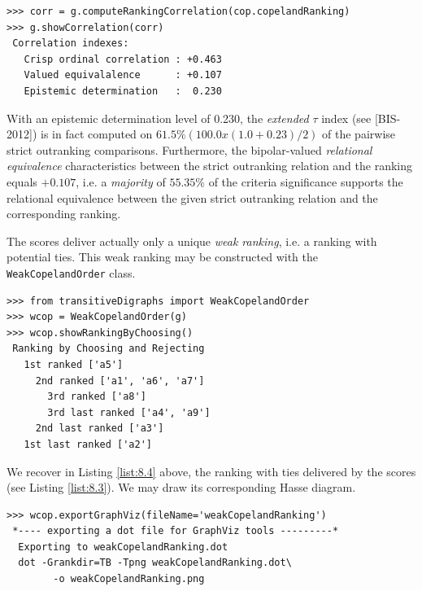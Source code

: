 \begin{lstlisting}[caption={Checking the quality of the \Copeland Ranking},label=list:8.4]
>>> corr = g.computeRankingCorrelation(cop.copelandRanking)
>>> g.showCorrelation(corr)
 Correlation indexes:
   Crisp ordinal correlation : +0.463
   Valued equivalalence      : +0.107
   Epistemic determination   :  0.230
\end{lstlisting}

With an epistemic determination level of 0.230, the \emph{extended} \Kendall $\tau$ index (see [BIS-2012]) is in fact computed on $61.5\% (100.0 x (1.0 + 0.23)/2)$ of the pairwise strict outranking comparisons. Furthermore, the bipolar-valued \emph{relational equivalence} characteristics between the strict outranking relation and the \Copeland ranking equals $+0.107$, i.e. a \emph{majority} of $55.35\%$ of the criteria significance supports the relational equivalence between the given strict outranking relation and the corresponding \Copeland ranking.

The \Copeland scores deliver actually only a unique \emph{weak ranking}, i.e. a ranking with potential ties. This weak ranking may be constructed with the \texttt{WeakCopelandOrder} class.

\begin{lstlisting}[caption={Checking the quality of the \Copeland Ranking},label=list:8.4]
>>> from transitiveDigraphs import WeakCopelandOrder
>>> wcop = WeakCopelandOrder(g)
>>> wcop.showRankingByChoosing()
 Ranking by Choosing and Rejecting
   1st ranked ['a5']
     2nd ranked ['a1', 'a6', 'a7']
       3rd ranked ['a8']
       3rd last ranked ['a4', 'a9']
     2nd last ranked ['a3']
   1st last ranked ['a2']
\end{lstlisting}

We recover in Listing \ref{list:8.4} above, the ranking with ties delivered by the \Copeland scores (see Listing \ref{list:8.3}). We may draw its corresponding Hasse diagram.

\begin{lstlisting}
>>> wcop.exportGraphViz(fileName='weakCopelandRanking')
 *---- exporting a dot file for GraphViz tools ---------*
  Exporting to weakCopelandRanking.dot
  dot -Grankdir=TB -Tpng weakCopelandRanking.dot\
        -o weakCopelandRanking.png
\end{lstlisting}

